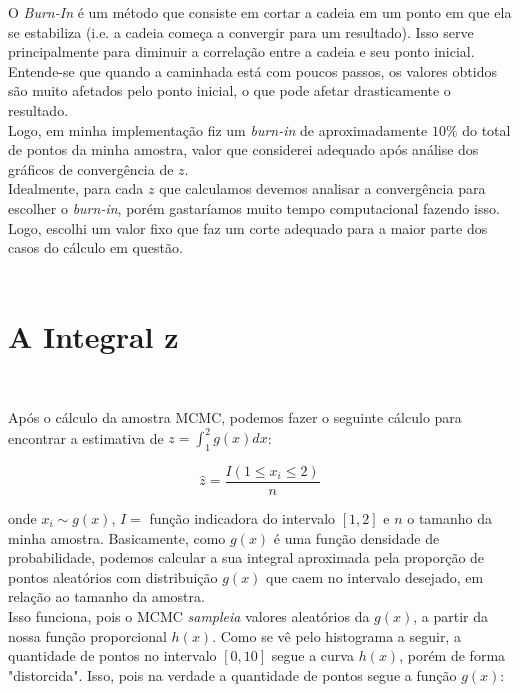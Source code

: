 \documentclass[pt12]{article}
\begin{document}
O \textit{Burn-In} é um método que consiste em cortar a cadeia em um ponto em que ela se estabiliza (i.e. a cadeia começa a convergir para um resultado). Isso serve principalmente para diminuir a correlação entre a cadeia e seu ponto inicial. Entende-se que quando a caminhada está com poucos passos, os valores obtidos são muito afetados pelo ponto inicial, o que pode afetar drasticamente o resultado.\\

Logo, em minha implementação fiz um \textit{burn-in} de aproximadamente $10\%$ do total de pontos da minha amostra, valor que considerei adequado após análise dos gráficos de convergência de $z$.\\

Idealmente, para cada $z$ que calculamos devemos analisar a convergência para escolher o \textit{burn-in}, porém gastaríamos muito tempo computacional fazendo isso. Logo, escolhi um valor fixo que faz um corte adequado para a maior parte dos casos do cálculo em questão.\\
\

\section{A Integral z}
\

Após o cálculo da amostra MCMC, podemos fazer o seguinte cálculo para encontrar a estimativa de $\displaystyle{z = \int_1^2 g(x)dx}$:

$$\hat{z} = \frac{I(1\leq x_i \leq 2)}{n}$$

\noindent onde $x_i \sim g(x)$, $I =$ função indicadora do intervalo $[1,2]$ e $n$ o tamanho da minha amostra. Basicamente, como $g(x)$ é uma função densidade de probabilidade, podemos calcular a sua integral aproximada pela proporção de pontos aleatórios com distribuição $g(x)$ que caem no intervalo desejado, em relação ao tamanho da amostra.\\

Isso funciona, pois o MCMC \textit{sampleia} valores aleatórios da $g(x)$, a partir da nossa função proporcional $h(x)$. Como se vê pelo histograma a seguir, a quantidade de pontos no intervalo $[0,10]$ segue a curva $h(x)$, porém de forma "distorcida". Isso, pois na verdade a quantidade de pontos segue a função $g(x)$:\\
\end{document}
